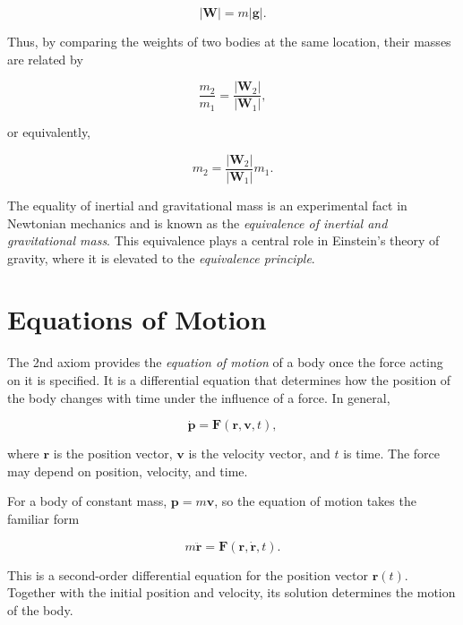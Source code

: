 \documentclass[../main.tex]{subfiles}
\begin{document}
\begin{equation}
|\mathbf{W}| = m|\mathbf{g}|.
\end{equation}

Thus, by comparing the weights of two bodies at the same location, their masses are related by

\begin{equation}
\frac{m_2}{m_1}
= \frac{|\mathbf{W}_2|}{|\mathbf{W}_1|},
\end{equation}

or equivalently,

\begin{equation}
m_2 = \frac{|\mathbf{W}_2|}{|\mathbf{W}_1|}m_1.
\end{equation}

The equality of inertial and gravitational mass is an experimental fact in Newtonian mechanics and is known as the \emph{equivalence of inertial and gravitational mass}. This equivalence plays a central role in Einstein's theory of gravity, where it is elevated to the \emph{equivalence principle}.


\section{Equations of Motion}

The 2nd axiom provides the \emph{equation of motion} of a body once the
force acting on it is specified. It is a differential equation that
determines how the position of the body changes with time under the
influence of a force. In general,

\begin{equation}
\dot{\mathbf{p}} = \mathbf{F}(\mathbf{r},\mathbf{v},t),
\end{equation}

where $\mathbf{r}$ is the position vector, $\mathbf{v}$ is the velocity
vector, and $t$ is time. The force may depend on position, velocity,
and time.

For a body of constant mass, $\mathbf{p}=m\mathbf{v}$, so the equation
of motion takes the familiar form

\begin{equation}
m\ddot{\mathbf{r}}
= \mathbf{F}(\mathbf{r},\dot{\mathbf{r}},t).
\end{equation}

This is a second-order differential equation for the position vector
$\mathbf{r}(t)$. Together with the initial position and velocity, its
solution determines the motion of the body.
\end{document}
